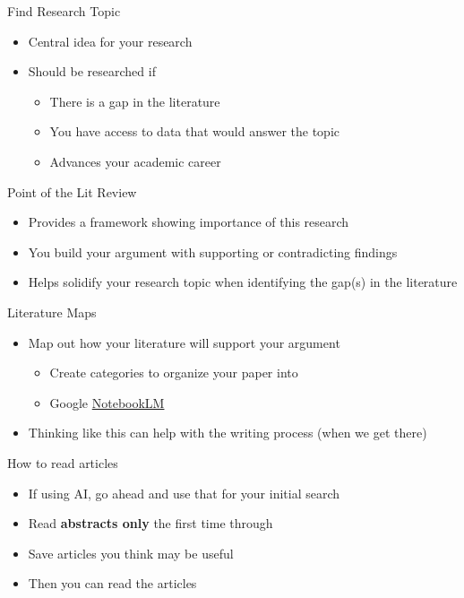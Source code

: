 \documentclass[
  ignorenonframetext,
]{beamer}
\providecommand{\tightlist}{%
  \setlength{\itemsep}{0pt}\setlength{\parskip}{0pt}}
\begin{document}
\begin{frame}{Find Research Topic}
\label{find-research-topic}
\begin{itemize}
\item
  Central idea for your research
\item
  Should be researched if

  \begin{itemize}
  \tightlist
  \item
    There is a gap in the literature
  \item
    You have access to data that would answer the topic
  \item
    Advances your academic career
  \end{itemize}
\end{itemize}
\end{frame}

\begin{frame}{Point of the Lit Review}
\label{point-of-the-lit-review}
\begin{itemize}
\item
  Provides a framework showing importance of this research
\item
  You build your argument with supporting or contradicting findings
\item
  Helps solidify your research topic when identifying the gap(s) in the
  literature
\end{itemize}
\end{frame}

\begin{frame}{Literature Maps}
\label{literature-maps}
\begin{itemize}
\tightlist
\item
  Map out how your literature will support your argument

  \begin{itemize}
  \tightlist
  \item
    Create categories to organize your paper into
  \item
    Google \href{https://sites.google.com/view/notebook-lm}{NotebookLM}
  \end{itemize}
\item
  Thinking like this can help with the writing process (when we get
  there)
\end{itemize}
\end{frame}

\begin{frame}{How to read articles}
\label{how-to-read-articles}
\begin{itemize}
\item
  If using AI, go ahead and use that for your initial search
\item
  Read \textbf{abstracts only} the first time through
\item
  Save articles you think may be useful
\item
  Then you can read the articles
\end{itemize}
\end{frame}
\end{document}
